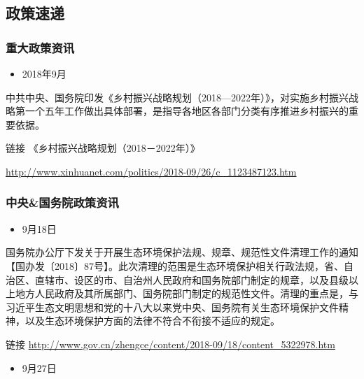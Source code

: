 \documentclass[
]{book}
\providecommand{\tightlist}{%
  \setlength{\itemsep}{0pt}\setlength{\parskip}{0pt}}
\begin{document}
\hypertarget{ux653fux7b56ux901fux9012-5}{%
\subsection*{政策速递}\label{ux653fux7b56ux901fux9012-5}}

\hypertarget{ux91cdux5927ux653fux7b56ux8d44ux8baf-5}{%
\subsubsection*{重大政策资讯}\label{ux91cdux5927ux653fux7b56ux8d44ux8baf-5}}

\begin{itemize}
\tightlist
\item
  2018年9月
\end{itemize}

中共中央、国务院印发《乡村振兴战略规划（2018---2022年）》，对实施乡村振兴战略第一个五年工作做出具体部署，是指导各地区各部门分类有序推进乡村振兴的重要依据。

链接 《乡村振兴战略规划（2018－2022年）》

\url{http://www.xinhuanet.com/politics/2018-09/26/c_1123487123.htm}

\hypertarget{ux4e2dux592eux56fdux52a1ux9662ux653fux7b56ux8d44ux8baf-5}{%
\subsubsection*{中央\&国务院政策资讯}\label{ux4e2dux592eux56fdux52a1ux9662ux653fux7b56ux8d44ux8baf-5}}

\begin{itemize}
\tightlist
\item
  9月18日
\end{itemize}

国务院办公厅下发关于开展生态环境保护法规、规章、规范性文件清理工作的通知【国办发〔2018〕87号】。此次清理的范围是生态环境保护相关行政法规，省、自治区、直辖市、设区的市、自治州人民政府和国务院部门制定的规章，以及县级以上地方人民政府及其所属部门、国务院部门制定的规范性文件。清理的重点是，与习近平生态文明思想和党的十八大以来党中央、国务院有关生态环境保护文件精神，以及生态环境保护方面的法律不符合不衔接不适应的规定。

链接 \url{http://www.gov.cn/zhengce/content/2018-09/18/content_5322978.htm}

\begin{itemize}
\tightlist
\item
  9月27日
\end{itemize}
\end{document}
